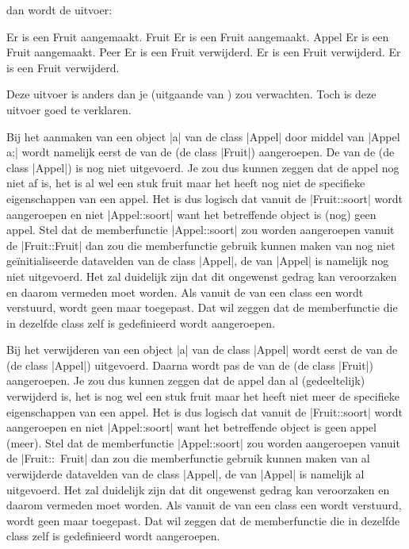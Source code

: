 \begin{cpplstShortInline}
dan wordt de uitvoer:
\begin{coutput}
Er is een Fruit aangemaakt.
Fruit
Er is een Fruit aangemaakt.
Appel
Er is een Fruit aangemaakt.
Peer
Er is een Fruit verwijderd.
Er is een Fruit verwijderd.
Er is een Fruit verwijderd.
\end{coutput}

Deze uitvoer is anders dan je (uitgaande van ) zou verwachten.
Toch is deze uitvoer goed te verklaren.

Bij het aanmaken van een object |a| van de class |Appel| door middel van |Appel a;| wordt namelijk eerst de  van de  (de class |Fruit|) aangeroepen.
De  van de  (de class |Appel|) is nog niet uitgevoerd.
Je zou dus kunnen zeggen dat de appel nog niet af is, het is al wel een stuk fruit maar het heeft nog niet de specifieke eigenschappen van een appel.
Het is dus logisch dat vanuit de  |Fruit::soort| wordt aangeroepen en niet |Appel::soort| want het betreffende object is (nog) geen appel.
Stel dat de memberfunctie |Appel::soort| zou worden aangeroepen vanuit de  |Fruit::Fruit| dan zou die memberfunctie gebruik kunnen maken
van nog niet geïnitialiseerde datavelden van de class |Appel|, de  van |Appel| is namelijk nog niet uitgevoerd.
Het zal duidelijk zijn dat dit ongewenst gedrag kan veroorzaken en daarom vermeden moet worden.
Als vanuit de  van een class een  wordt verstuurd, wordt geen  maar \emph{} toegepast.
Dat wil zeggen dat de memberfunctie die in dezelfde class zelf is gedefinieerd wordt aangeroepen.

Bij het verwijderen van een object |a| van de class |Appel| wordt eerst de  van de  (de class |Appel|) uitgevoerd.
Daarna wordt pas de  van de  (de class |Fruit|) aangeroepen.
Je zou dus kunnen zeggen dat de appel dan al (gedeeltelijk) verwijderd is, het is nog wel een stuk fruit maar het heeft niet meer de specifieke eigenschappen van een appel.
Het is dus logisch dat vanuit de  |Fruit::soort| wordt aangeroepen en niet |Appel::soort| want het betreffende object is geen appel (meer). 
Stel dat de memberfunctie |Appel::soort| zou worden aangeroepen vanuit de  |Fruit::~Fruit| dan zou die memberfunctie gebruik kunnen maken van al verwijderde datavelden van de class |Appel|, de  van |Appel| is namelijk al uitgevoerd.
Het zal duidelijk zijn dat dit ongewenst gedrag kan veroorzaken en daarom vermeden moet worden.
Als vanuit de  van een class een  wordt verstuurd, wordt geen  maar \emph{} toegepast.
Dat wil zeggen dat de memberfunctie die in dezelfde class zelf is gedefinieerd wordt aangeroepen.


\end{cpplstShortInline}
